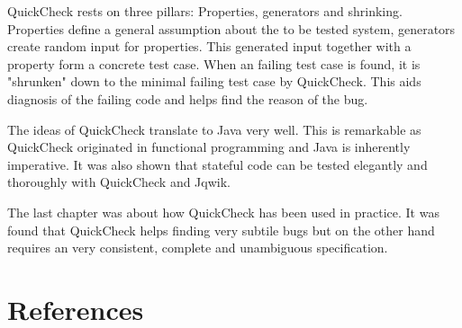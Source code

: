 \documentclass[a4paper, 12pt]{article} %
\begin{document}

QuickCheck rests on three pillars: Properties, generators and shrinking. Properties define a general assumption about the to be tested system, generators create random input for properties. This generated input together with a property form a concrete test case. When an failing test case is found, it is "shrunken" down to the minimal failing test case by QuickCheck. This aids diagnosis of the failing code and helps find the reason of the bug. 


The ideas of QuickCheck translate to Java very well. This is remarkable as QuickCheck originated in functional programming and Java is inherently imperative. It was also shown that stateful code can be tested elegantly and thoroughly with QuickCheck and Jqwik. 


The last chapter was about how QuickCheck has been used in practice. It was found that QuickCheck helps finding very subtile bugs but on the other hand requires an very consistent, complete and unambiguous specification. 


\newpage
\section{References}
\printbibliography[heading=none]
\end{document}
